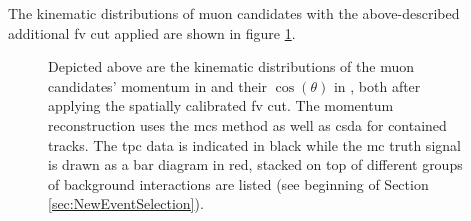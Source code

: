 The kinematic distributions of muon candidates with the above-described additional \gls{fv} cut applied are shown in figure \ref{fig:PreselectionDistributions}.
\begin{figure}[htbp]
	\begin{center} \centering
        \caption[Muon Candidate Momentum and $\cos{(\theta)}$ Distributions after Pre-Selection]{Depicted above are the kinematic distributions of the muon candidates' momentum in  and their $\cos{(\theta)}$ in , both after applying the spatially calibrated \gls{fv} cut. The momentum reconstruction uses the \gls{mcs} method as well as \gls{csda} for contained tracks. The \gls{tpc} data is indicated in black while the \gls{mc} truth signal is drawn as a bar diagram in red, stacked on top of different groups of background interactions are listed (see beginning of Section \ref{sec:NewEventSelection}).} 
        \label{fig:PreselectionDistributions}
	\end{center}
\end{figure}
